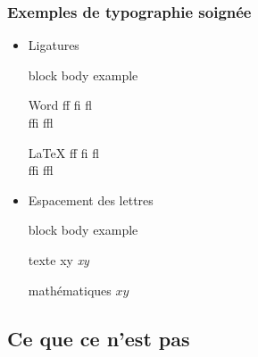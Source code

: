 \documentclass[aspectratio=54,10pt,xcolor=x11names]{beamer}
\newenvironment{demo}{%
    \begin{beamercolorbox}[wd=\linewidth,sep=6pt]{block body example}}
    {\end{beamercolorbox}}
\theoremstyle{example}
\begin{document}
\begin{frame}
  \frametitle{Exemples de typographie soignée}
  \begin{itemize}
  \item Ligatures
    \begin{demo}
      \begin{minipage}{0.42\linewidth}
        \vspace{-12pt}
        \begin{block}{\small Word}
          \LARGE\rmfamily f\/f \quad f\/i \quad f\/l \\ f\/f\/i \quad
          f\/f\/l
        \end{block}
      \end{minipage}
      \hfill
      \begin{minipage}{0.42\linewidth}
        \vspace{-12pt}
        \begin{block}{\small \LaTeX}
          \LARGE\rmfamily ff \quad fi \quad fl \\ ffi \quad ffl
        \end{block}
      \end{minipage}
    \end{demo}
  \item Espacement des lettres
    \begin{demo}
      \begin{minipage}{0.45\linewidth}
        \vspace{-12pt}
        \begin{block}{\small texte}
          \LARGE\rmfamily xy \quad \emph{xy}
        \end{block}
      \end{minipage}
      \hfill
      \begin{minipage}{0.4\linewidth}
        \vspace{-12pt}
        \begin{block}{\small mathématiques}
          \LARGE $xy$
        \end{block}
      \end{minipage}
    \end{demo}
  \end{itemize}
\end{frame}

\subsection{Ce que ce n'est pas}
\end{document}
